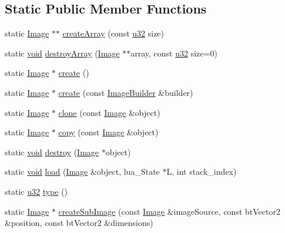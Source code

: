 \subsection*{Static Public Member Functions}
\begin{DoxyCompactItemize}
\item 
static \mbox{\hyperlink{classnjli_1_1_image}{Image}} $\ast$$\ast$ \mbox{\hyperlink{classnjli_1_1_image_ae62db131c7273ee573399de9e63249ab}{create\+Array}} (const \mbox{\hyperlink{_util_8h_a10e94b422ef0c20dcdec20d31a1f5049}{u32}} size)
\item 
static \mbox{\hyperlink{_thread_8h_af1e856da2e658414cb2456cb6f7ebc66}{void}} \mbox{\hyperlink{classnjli_1_1_image_ab90237b3d43d565d2e06763b53ccf339}{destroy\+Array}} (\mbox{\hyperlink{classnjli_1_1_image}{Image}} $\ast$$\ast$array, const \mbox{\hyperlink{_util_8h_a10e94b422ef0c20dcdec20d31a1f5049}{u32}} size=0)
\item 
static \mbox{\hyperlink{classnjli_1_1_image}{Image}} $\ast$ \mbox{\hyperlink{classnjli_1_1_image_af5df1abd1524c9c941be7f6d3f59e78b}{create}} ()
\item 
static \mbox{\hyperlink{classnjli_1_1_image}{Image}} $\ast$ \mbox{\hyperlink{classnjli_1_1_image_a610e5319fd868f5a42d3bfcc6a7b80b6}{create}} (const \mbox{\hyperlink{classnjli_1_1_image_builder}{Image\+Builder}} \&builder)
\item 
static \mbox{\hyperlink{classnjli_1_1_image}{Image}} $\ast$ \mbox{\hyperlink{classnjli_1_1_image_a26954d0fb6f0c64d153b017ce1e9fb5e}{clone}} (const \mbox{\hyperlink{classnjli_1_1_image}{Image}} \&object)
\item 
static \mbox{\hyperlink{classnjli_1_1_image}{Image}} $\ast$ \mbox{\hyperlink{classnjli_1_1_image_ad9424683b5e161bf3688bae039a7dbca}{copy}} (const \mbox{\hyperlink{classnjli_1_1_image}{Image}} \&object)
\item 
static \mbox{\hyperlink{_thread_8h_af1e856da2e658414cb2456cb6f7ebc66}{void}} \mbox{\hyperlink{classnjli_1_1_image_a8f66b61abba71241a7facb9a5cd3c245}{destroy}} (\mbox{\hyperlink{classnjli_1_1_image}{Image}} $\ast$object)
\item 
static \mbox{\hyperlink{_thread_8h_af1e856da2e658414cb2456cb6f7ebc66}{void}} \mbox{\hyperlink{classnjli_1_1_image_aedfe2aac8686b752e7f2a37d9c6c798b}{load}} (\mbox{\hyperlink{classnjli_1_1_image}{Image}} \&object, lua\+\_\+\+State $\ast$L, int stack\+\_\+index)
\item 
static \mbox{\hyperlink{_util_8h_a10e94b422ef0c20dcdec20d31a1f5049}{u32}} \mbox{\hyperlink{classnjli_1_1_image_a431a16a61a1c5e5c8c45926ff421b86a}{type}} ()
\item 
static \mbox{\hyperlink{classnjli_1_1_image}{Image}} $\ast$ \mbox{\hyperlink{classnjli_1_1_image_acc43a6c5082de6a16b36b23ebb9d9b27}{create\+Sub\+Image}} (const \mbox{\hyperlink{classnjli_1_1_image}{Image}} \&image\+Source, const bt\+Vector2 \&position, const bt\+Vector2 \&dimensions)
\end{DoxyCompactItemize}
